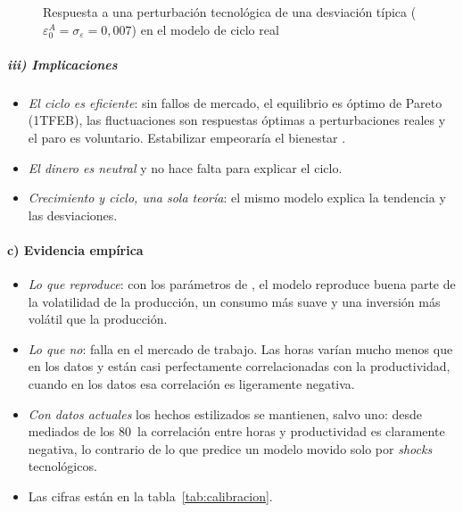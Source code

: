 \documentclass[11pt]{article}
\begin{document}
\begin{figure}[H]
\centering
\caption{Respuesta a una perturbación tecnológica de una desviación típica ($\varepsilon^A_0=\sigma_\varepsilon=0{,}007$) en el modelo de ciclo real}\label{fig:irf-rbc}
\end{figure}

\subparagraph{iii) Implicaciones}

\begin{itemize}
\item \emph{El ciclo es eficiente}: sin fallos de mercado, el equilibrio es óptimo de Pareto (1TFEB), las fluctuaciones son respuestas óptimas a perturbaciones reales y el paro es voluntario. Estabilizar empeoraría el bienestar .
\item \emph{El dinero es neutral} y no hace falta para explicar el ciclo.
\item \emph{Crecimiento y ciclo, una sola teoría}: el mismo modelo explica la tendencia y las desviaciones.
\end{itemize}

\paragraph{c) Evidencia empírica}

\begin{itemize}
\item \emph{Lo que reproduce}: con los parámetros de \textcite{Prescott1986}, el modelo reproduce buena parte de la volatilidad de la producción, un consumo más suave y una inversión más volátil que la producción\nocite{HansenWright1992Labor}.
\item \emph{Lo que no}: falla en el mercado de trabajo. Las horas varían mucho menos que en los datos y están casi perfectamente correlacionadas con la productividad, cuando en los datos esa correlación es ligeramente negativa.
\item \emph{Con datos actuales} los hechos estilizados se mantienen, salvo uno: desde mediados de los 80~la correlación entre horas y productividad es claramente negativa, lo contrario de lo que predice un modelo movido solo por \emph{shocks} tecnológicos\nocite{FRED2026CicloEEUU}.
\item Las cifras están en la tabla~\ref{tab:calibracion}.
\end{itemize}
\end{document}
